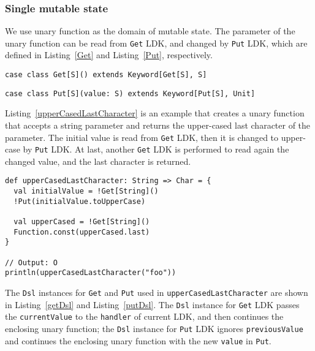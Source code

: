 \subsubsection{Single mutable state}

We use unary function as the domain of mutable state. The parameter of the unary function can be read from \lstinline{Get} LDK, and changed by \lstinline{Put} LDK, which are defined in Listing~\ref{Get} and Listing~\ref{Put}, respectively.

\begin{lstlisting}[caption={The definition of \lstinline{Get} LDK},label={Get}]
case class Get[S]() extends Keyword[Get[S], S]
\end{lstlisting}

\begin{lstlisting}[caption={The definition of \lstinline{Put} LDK},label={Put}]
case class Put[S](value: S) extends Keyword[Put[S], Unit]
\end{lstlisting}

Listing~\ref{upperCasedLastCharacter} is an example that creates a unary function that accepts a string parameter and returns the upper-cased last character of the parameter. The initial value is read from \lstinline{Get} LDK, then it is changed to upper-case by \lstinline{Put} LDK. At last, another \lstinline{Get} LDK is performed to read again  the changed value, and the last character is returned.

\begin{lstlisting}[caption={Using \lstinline{Get} and \lstinline{Put} in a unary function},label={upperCasedLastCharacter}]
def upperCasedLastCharacter: String => Char = {
  val initialValue = !Get[String]()
  !Put(initialValue.toUpperCase)

  val upperCased = !Get[String]()
  Function.const(upperCased.last)
}

// Output: O
println(upperCasedLastCharacter("foo"))
\end{lstlisting}

The \lstinline{Dsl} instances for \lstinline{Get} and \lstinline{Put} used in \lstinline{upperCasedLastCharacter} are shown in Listing~\ref{getDsl} and Listing~\ref{putDsl}. The \lstinline{Dsl} instance for \lstinline{Get} LDK passes the \lstinline{currentValue} to the \lstinline{handler} of current LDK, and then continues the enclosing unary function; the \lstinline{Dsl} instance for \lstinline{Put} LDK ignores \lstinline{previousValue} and continues the enclosing unary function with the new \lstinline{value} in \lstinline{Put}.

